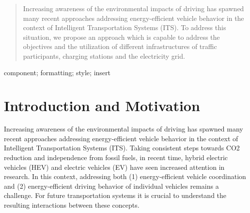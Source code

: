 \documentclass[conference]{IEEEtran}
\begin{document}
\maketitle

\thispagestyle{plain}


\begin{abstract}
Increasing awareness of the environmental impacts of driving has spawned many
recent approaches addressing energy-efficient vehicle behavior in the context of
Intelligent Transportation Systems (ITS). To address this situation, we propose an approach which is capable to address the objectives and the utilization of different infrastructures of traffic participants, charging stations and the electricity grid.
\end{abstract}


\begin{keywords}
component; formatting; style; insert 
\end{keywords}


%
\IEEEpeerreviewmaketitle



\section{Introduction and Motivation}
Increasing awareness of the environmental impacts of driving has spawned many recent approaches addressing energy-efficient vehicle behavior in the context of Intelligent Transportation Systems (ITS). Taking consistent steps towards CO2 reduction and independence from fossil fuels, in recent time, hybrid electric vehicles (HEV) and electric vehicles (EV) have seen increased attention in research. In this context, addressing both (1) energy-efficient vehicle coordination and (2) energy-efficient driving behavior of individual vehicles remains a challenge. For future transportation systems it is crucial to understand the resulting interactions between these concepts.
\end{document}
